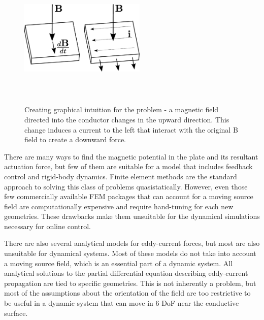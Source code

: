 
\begin{figure}
\includegraphics[width = 6cm, height = 6cm ]{figures/iso_force_creation.eps}
\label{fig:force_generation}
\caption{Creating graphical intuition for the problem - a magnetic field directed into the conductor changes in the upward direction. This change induces a current to the left that interact with the original B field to create a downward force.}
\end{figure}

There are many ways to find the magnetic potential in the plate and its resultant actuation force, but few of them are suitable for a model that includes feedback control and rigid-body dynamics. \cite{Paudel2013}
Finite element methods are the standard approach to solving this class of problems quasistatically. However, even those few commercially available FEM packages that can account for a moving source field are computationally expensive and require hand-tuning for each new geometries. These drawbacks make them unsuitable for the dynamical simulations necessary for online control. 

There are also several analytical models for eddy-current forces, but most are also unsuitable for dynamical systems. Most of these models do not take into account a moving source field, which is an essential part of a dynamic system. All analytical solutions to the partial differential equation describing eddy-current propagation are tied to specific geometries. This is not inherently a problem, but most of the assumptions about the orientation of the field are too restrictive to be useful in a dynamic system that can move in 6 DoF near the conductive surface. 

